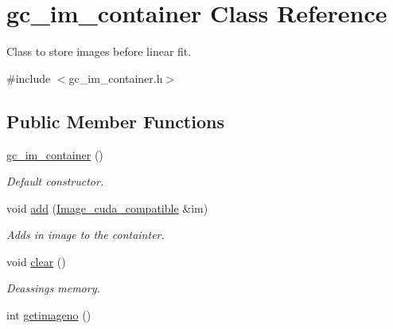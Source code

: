 \hypertarget{classgc__im__container}{}\section{gc\+\_\+im\+\_\+container Class Reference}
\label{classgc__im__container}


Class to store images before linear fit.  




{\ttfamily \#include $<$gc\+\_\+im\+\_\+container.\+h$>$}

\subsection*{Public Member Functions}
\begin{DoxyCompactItemize}
\item 
\hyperlink{classgc__im__container_af5a0249e639585c347c80b82615d7e6f}{gc\+\_\+im\+\_\+container} ()\hypertarget{classgc__im__container_af5a0249e639585c347c80b82615d7e6f}{}\label{classgc__im__container_af5a0249e639585c347c80b82615d7e6f}

\begin{DoxyCompactList}\small\item\em Default constructor. \end{DoxyCompactList}\item 
void \hyperlink{classgc__im__container_a90e9cc6f3b17ee36228c9807675bc5ef}{add} (\hyperlink{classImage__cuda__compatible}{Image\+\_\+cuda\+\_\+compatible} \&im)\hypertarget{classgc__im__container_a90e9cc6f3b17ee36228c9807675bc5ef}{}\label{classgc__im__container_a90e9cc6f3b17ee36228c9807675bc5ef}

\begin{DoxyCompactList}\small\item\em Adds in image to the containter. \end{DoxyCompactList}\item 
void \hyperlink{classgc__im__container_a2a58af5fd3ea64a9efe1c632e6e7a111}{clear} ()\hypertarget{classgc__im__container_a2a58af5fd3ea64a9efe1c632e6e7a111}{}\label{classgc__im__container_a2a58af5fd3ea64a9efe1c632e6e7a111}

\begin{DoxyCompactList}\small\item\em Deassings memory. \end{DoxyCompactList}\item 
int \hyperlink{classgc__im__container_af1f0bd117c4691d73178142a156dabec}{getimageno} ()\hypertarget{classgc__im__container_af1f0bd117c4691d73178142a156dabec}{}\label{classgc__im__container_af1f0bd117c4691d73178142a156dabec}


\end{DoxyCompactItemize}
